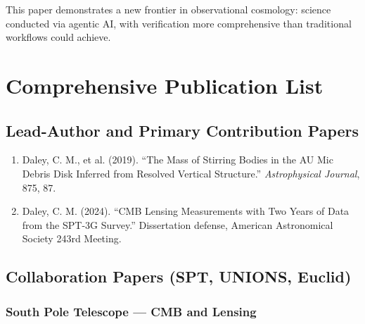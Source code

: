 \documentclass[11pt,a4paper]{article}
\begin{document}
This paper demonstrates a new frontier in observational cosmology: science conducted via agentic AI, with verification more comprehensive than traditional workflows could achieve.

\section*{Comprehensive Publication List}

\subsection*{Lead-Author and Primary Contribution Papers}

\begin{enumerate}
\item Daley, C. M., et al. (2019). ``The Mass of Stirring Bodies in the AU Mic Debris Disk Inferred from Resolved Vertical Structure.'' \textit{Astrophysical Journal}, 875, 87.

\item Daley, C. M. (2024). ``CMB Lensing Measurements with Two Years of Data from the SPT-3G Survey.'' Dissertation defense, American Astronomical Society 243rd Meeting.
\end{enumerate}

\subsection*{Collaboration Papers (SPT, UNIONS, Euclid)}

\subsubsection*{South Pole Telescope --- CMB and Lensing}
\end{document}
